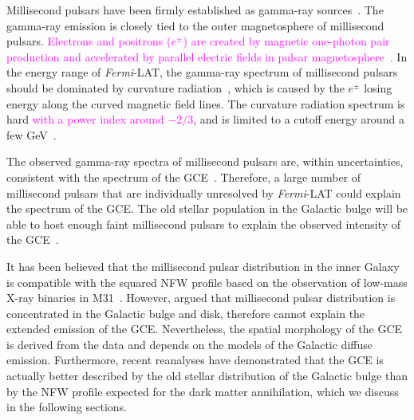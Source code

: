 \documentclass[doublespace,nopageskip]{VTthesis} %
\newcommand{\DS}[1]{\textcolor{magenta}{#1}}
\begin{document}
Millisecond pulsars have been firmly established as gamma-ray sources~\citep{1996A&A...311L...9V,2009ApJ...699.1171A,2013MNRAS.430..571E,2013ApJS..208...17A}. The gamma-ray emission is closely tied to the outer magnetosphere of millisecond pulsars. 
\DS{Electrons and positrons ($e^\pm$) are created by magnetic one-photon pair production and accelerated by parallel electric fields in pulsar magnetosphere~\cite{2021arXiv210105751H}.}
In the energy range of \textit{Fermi}-LAT, the gamma-ray spectrum of millisecond pulsars should be dominated by curvature radiation~\cite{2013ApJS..208...17A}, which is caused by the $e^\pm$ losing energy along the curved magnetic field lines. The curvature radiation spectrum is hard \DS{with a power index around $-2/3$}, and is limited to a
cutoff energy around a few GeV~\cite{2005ApJ...622..531H}.

The observed gamma-ray spectra of millisecond pulsars are, within uncertainties, consistent with the spectrum of the GCE~\cite{2011JCAP...03..010A}. Therefore, a large number of millisecond pulsars that are individually unresolved by \textit{Fermi}-LAT could explain the spectrum of the GCE. The old stellar population in the Galactic bulge will be able to host enough faint millisecond pulsars to explain the observed intensity of the GCE~\cite{2018ApJ...863..199G,2020JCAP...12..035P}.

It has been believed that the millisecond pulsar distribution in the inner Galaxy is compatible with the squared NFW profile based on the observation of low-mass X-ray binaries in M31~\cite{2012PhRvD..86h3511A}. However, \citet{2013PhRvD..88h3009H} argued that millisecond pulsar distribution is concentrated in the Galactic bulge and disk, therefore cannot explain the extended emission of the GCE. Nevertheless, the spatial morphology of the GCE is derived from the data and depends on the models of the Galactic diffuse emission. Furthermore, recent reanalyses have demonstrated that the GCE is actually better described by the old stellar distribution of the Galactic bulge than by the NFW profile expected for the dark matter annihilation, which we discuss in the following sections.



\end{document}
